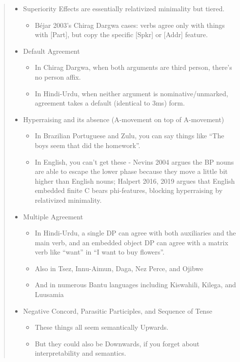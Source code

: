 \begin{abstract}
\begin{itemize}
  \item Superiority Effects are essentially relativized minimality but tiered.
  \begin{itemize}
    \item Béjar 2003’s Chirag Dargwa cases: verbs agree only with things with [Part], but copy the specific [Spkr] or [Addr] feature.
  \end{itemize}
  \item Default Agreement
  \begin{itemize}
    \item In Chirag Dargwa, when both arguments are third person, there’s no person affix.
    \item In Hindi-Urdu, when neither argument is nominative/unmarked, agreement takes a default (identical to 3ms) form.
  \end{itemize}
  \item Hyperraising and its absence (A-movement on top of A-movement)
  \begin{itemize}
    \item In Brazilian Portuguese and Zulu, you can say things like “The boys seem that did the homework”.
    \item In English, you can’t get these - Nevins 2004 argues the BP nouns are able to escape the lower phase because they move a little bit higher than English nouns; Halpert 2016, 2019 argues that English embedded finite C bears phi-features, blocking hyperraising by relativized minimality.
  \end{itemize}
  \item Multiple Agreement
  \begin{itemize}
    \item In Hindi-Urdu, a single DP can agree with both auxiliaries and the main verb, and an embedded object DP can agree with a matrix verb like “want” in “I want to buy flowers”.
    \item Also in Tsez, Innu-Aimun, Daga, Nez Perce, and Ojibwe
    \item And in numerous Bantu languages including Kiswahili, Kilega, and Luusamia
  \end{itemize}
  \item Negative Concord, Parasitic Participles, and Sequence of Tense
  \begin{itemize}
    \item These things all seem semantically Upwards.
    \item But they could also be Downwards, if you forget about interpretability and semantics.
  \end{itemize}
\end{itemize}
\end{abstract}

